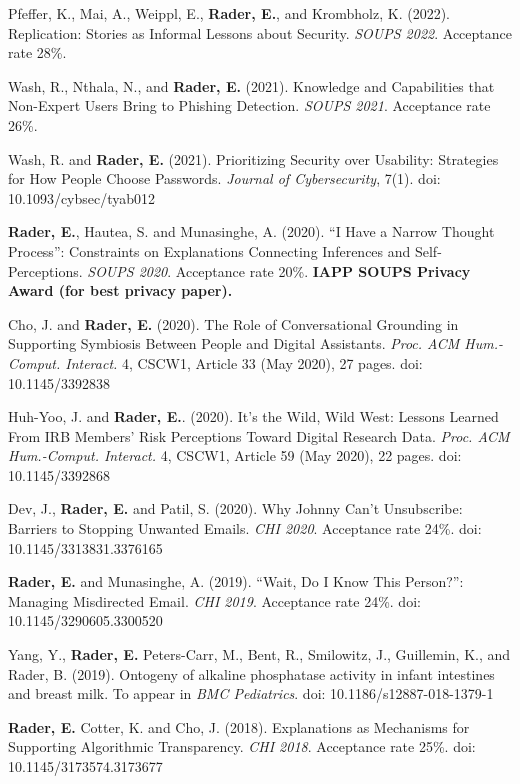 \documentclass[9pt]{extarticle}
\begin{document}
Pfeffer, K., Mai, A., Weippl, E., \textbf{Rader, E.}, and  Krombholz, K. (2022). Replication: Stories as Informal Lessons about Security. \emph{SOUPS 2022}. Acceptance rate 28\%.

Wash, R., Nthala, N., and \textbf{Rader, E.} (2021). Knowledge and Capabilities that Non-Expert Users Bring to Phishing Detection. \emph{SOUPS 2021}. Acceptance rate 26\%. 

Wash, R. and \textbf{Rader, E.} (2021). Prioritizing Security over Usability: Strategies for How People Choose Passwords. \emph{Journal of Cybersecurity}, 7(1). doi: 10.1093/cybsec/tyab012

\textbf{Rader, E.}, Hautea, S. and Munasinghe, A. (2020). ``I Have a Narrow Thought Process'': Constraints on Explanations Connecting Inferences and Self-Perceptions. \emph{SOUPS 2020}. Acceptance rate 20\%. \textbf{IAPP SOUPS Privacy Award (for best privacy paper).}

Cho, J. and \textbf{Rader, E.} (2020). The Role of Conversational Grounding in Supporting Symbiosis Between People and Digital Assistants. \emph{Proc. ACM Hum.-Comput. Interact.} 4, CSCW1, Article 33 (May 2020), 27 pages. doi: 10.1145/3392838

Huh-Yoo, J. and \textbf{Rader, E.}. (2020). It's the Wild, Wild West: Lessons Learned From IRB Members' Risk Perceptions Toward Digital Research Data. \emph{Proc. ACM Hum.-Comput. Interact.} 4, CSCW1, Article 59 (May 2020), 22 pages. doi: 10.1145/3392868

Dev, J., \textbf{Rader, E.} and Patil, S. (2020). Why Johnny Can't Unsubscribe: Barriers to Stopping Unwanted Emails. \emph{CHI 2020}. Acceptance rate 24\%. doi: 10.1145/3313831.3376165

\textbf{Rader, E.} and Munasinghe, A. (2019). ``Wait, Do I Know This Person?'': Managing Misdirected Email.  \emph{CHI 2019}. Acceptance rate 24\%. doi: 10.1145/3290605.3300520

Yang, Y., \textbf{Rader, E.} Peters-Carr, M., Bent, R., Smilowitz, J., Guillemin, K., and Rader, B. (2019). Ontogeny of alkaline phosphatase activity in infant intestines and breast milk. To appear in \emph{BMC Pediatrics}. doi: 10.1186/s12887-018-1379-1

\textbf{Rader, E.} Cotter, K. and Cho, J. (2018). Explanations as Mechanisms for Supporting Algorithmic Transparency.  \emph{CHI 2018}. Acceptance rate 25\%. doi: 10.1145/3173574.3173677
\end{document}
